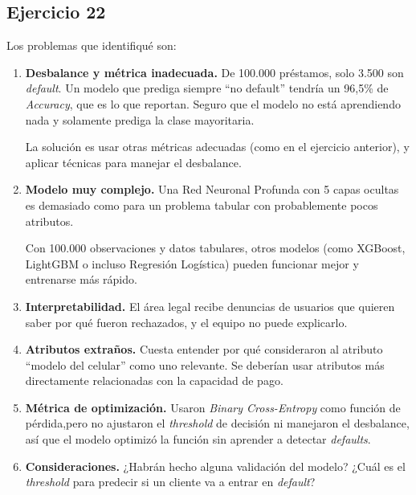 \documentclass[a4paper,12pt]{article}
\begin{document}
        \subsection*{Ejercicio 22}
            \noindent Los problemas que identifiqué son:
            \begin{enumerate}
                \item \textbf{Desbalance y métrica inadecuada.} De 100.000 préstamos, solo 3.500 son \textit{default}. Un modelo que prediga siempre ``no default'' tendría un 96,5\% de \textit{Accuracy}, que es lo que reportan. Seguro que el modelo no está aprendiendo nada y solamente prediga la clase mayoritaria. 

                    La solución es usar otras métricas adecuadas (como en el ejercicio anterior), y aplicar técnicas para manejar el desbalance.
                \item \textbf{Modelo muy complejo.} Una Red Neuronal Profunda con 5 capas ocultas es demasiado como para un problema tabular con probablemente pocos atributos. 

                    Con 100.000 observaciones y datos tabulares, otros modelos (como XGBoost, LightGBM o incluso Regresión Logística) pueden funcionar mejor y entrenarse más rápido.
                \item \textbf{Interpretabilidad.} El área legal recibe denuncias de usuarios que quieren saber por qué fueron rechazados, y el equipo no puede explicarlo.
                \item \textbf{Atributos extraños.} Cuesta entender por qué consideraron al atributo ``modelo del celular'' como uno relevante. Se deberían usar atributos más directamente relacionadas con la capacidad de pago.
                \item \textbf{Métrica de optimización.} Usaron \textit{Binary Cross-Entropy} como función de pérdida,pero no ajustaron el \textit{threshold} de decisión ni manejaron el desbalance, así que el modelo optimizó la función sin aprender a detectar \textit{defaults}.
                \item \textbf{Consideraciones.} ¿Habrán hecho alguna validación del modelo? ¿Cuál es el \textit{threshold} para predecir si un cliente va a entrar en \textit{default}?
            \end{enumerate}
\end{document}
